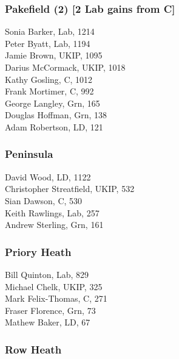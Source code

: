 \documentclass[a4paper,openany,10pt]{book}
\begin{document}
\subsubsection*{Pakefield (2) \hspace*{\fill}\nolinebreak[1]%
\enspace\hspace*{\fill}
[2 Lab gains from C]}



Sonia Barker, Lab, 1214\\
Peter Byatt, Lab, 1194\\
Jamie Brown, UKIP, 1095\\
Darius McCormack, UKIP, 1018\\
Kathy Gosling, C, 1012\\
Frank Mortimer, C, 992\\
George Langley, Grn, 165\\
Douglas Hoffman, Grn, 138\\
Adam Robertson, LD, 121\\


\subsubsection*{Peninsula}



David Wood, LD, 1122\\
{Christopher Streatfield}, UKIP, 532\\
Sian Dawson, C, 530\\
Keith Rawlings, Lab, 257\\
Andrew Sterling, Grn, 161\\


\subsubsection*{Priory Heath}



Bill Quinton, Lab, 829\\
Michael Chelk, UKIP, 325\\
Mark Felix-Thomas, C, 271\\
Fraser Florence, Grn, 73\\
Mathew Baker, LD, 67\\


\subsubsection*{Row Heath}
\end{document}
